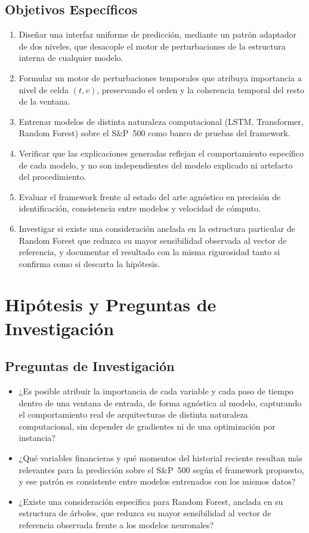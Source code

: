 \subsection{Objetivos Específicos}
\begin{enumerate}
    \item Diseñar una interfaz uniforme de predicción, mediante un patrón adaptador de dos niveles, que desacople el motor de perturbaciones de la estructura interna de cualquier modelo.
    \item Formular un motor de perturbaciones temporales que atribuya importancia a nivel de celda $(t,v)$, preservando el orden y la coherencia temporal del resto de la ventana.
    \item Entrenar modelos de distinta naturaleza computacional (LSTM, Transformer, Random Forest) sobre el S\&P~500 como banco de pruebas del framework.
    \item Verificar que las explicaciones generadas reflejan el comportamiento específico de cada modelo, y no son independientes del modelo explicado ni artefacto del procedimiento.
    \item Evaluar el framework frente al estado del arte agnóstico en precisión de identificación, consistencia entre modelos y velocidad de cómputo.
    \item Investigar si existe una consideración anclada en la estructura particular de Random Forest que reduzca su mayor sensibilidad observada al vector de referencia, y documentar el resultado con la misma rigurosidad tanto si confirma como si descarta la hipótesis.
\end{enumerate}

\section{Hipótesis y Preguntas de Investigación}

\subsection{Preguntas de Investigación}
\begin{itemize}
    \item[\textbf{P1:}] ¿Es posible atribuir la importancia de cada variable y cada paso de tiempo dentro de una ventana de entrada, de forma agnóstica al modelo, capturando el comportamiento real de arquitecturas de distinta naturaleza computacional, sin depender de gradientes ni de una optimización por instancia?
    \item[\textbf{P2:}] ¿Qué variables financieras y qué momentos del historial reciente resultan más relevantes para la predicción sobre el S\&P~500 según el framework propuesto, y ese patrón es consistente entre modelos entrenados con los mismos datos?
    \item[\textbf{P3:}] ¿Existe una consideración específica para Random Forest, anclada en su estructura de árboles, que reduzca su mayor sensibilidad al vector de referencia observada frente a los modelos neuronales?
\end{itemize}

